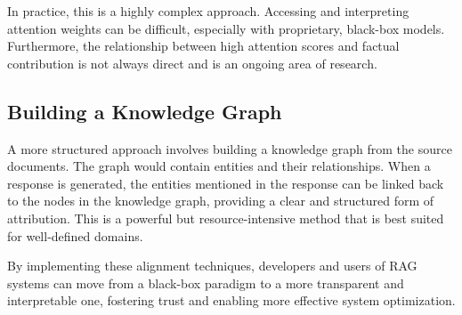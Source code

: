 In practice, this is a highly complex approach. Accessing and interpreting attention weights can be difficult, especially with proprietary, black-box models. Furthermore, the relationship between high attention scores and factual contribution is not always direct and is an ongoing area of research.

\subsection{Building a Knowledge Graph}
A more structured approach involves building a knowledge graph from the source documents. The graph would contain entities and their relationships. When a response is generated, the entities mentioned in the response can be linked back to the nodes in the knowledge graph, providing a clear and structured form of attribution. This is a powerful but resource-intensive method that is best suited for well-defined domains.

By implementing these alignment techniques, developers and users of RAG systems can move from a black-box paradigm to a more transparent and interpretable one, fostering trust and enabling more effective system optimization.